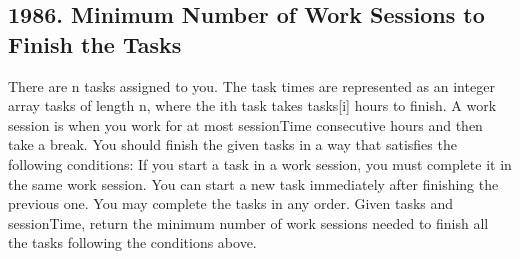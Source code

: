 \documentclass[9pt, b5paper]{article}
\begin{document}
\subsection{1986. Minimum Number of Work Sessions to Finish the Tasks}
\label{sec-3-5}
There are n tasks assigned to you. The task times are represented as an integer array tasks of length n, where the ith task takes tasks[i] hours to finish. A work session is when you work for at most sessionTime consecutive hours and then take a break.
You should finish the given tasks in a way that satisfies the following conditions:
If you start a task in a work session, you must complete it in the same work session.
You can start a new task immediately after finishing the previous one.
You may complete the tasks in any order.
Given tasks and sessionTime, return the minimum number of work sessions needed to finish all the tasks following the conditions above.
\end{document}
